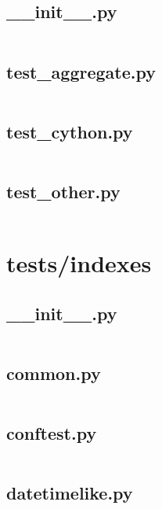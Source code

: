 \documentclass{article}
\begin{document}
\subsection{\_\_init\_\_.py}
\inputminted{python}{/home/dufferzafar/dev/@clones/pandas/pandas/tests/groupby/aggregate/__init__.py}
\newpage

\subsection{test\_aggregate.py}
\inputminted{python}{/home/dufferzafar/dev/@clones/pandas/pandas/tests/groupby/aggregate/test_aggregate.py}
\newpage

\subsection{test\_cython.py}
\inputminted{python}{/home/dufferzafar/dev/@clones/pandas/pandas/tests/groupby/aggregate/test_cython.py}
\newpage

\subsection{test\_other.py}
\inputminted{python}{/home/dufferzafar/dev/@clones/pandas/pandas/tests/groupby/aggregate/test_other.py}
\newpage

\section{tests/indexes}

\subsection{\_\_init\_\_.py}
\inputminted{python}{/home/dufferzafar/dev/@clones/pandas/pandas/tests/indexes/__init__.py}
\newpage

\subsection{common.py}
\inputminted{python}{/home/dufferzafar/dev/@clones/pandas/pandas/tests/indexes/common.py}
\newpage

\subsection{conftest.py}
\inputminted{python}{/home/dufferzafar/dev/@clones/pandas/pandas/tests/indexes/conftest.py}
\newpage

\subsection{datetimelike.py}
\inputminted{python}{/home/dufferzafar/dev/@clones/pandas/pandas/tests/indexes/datetimelike.py}
\newpage
\end{document}
